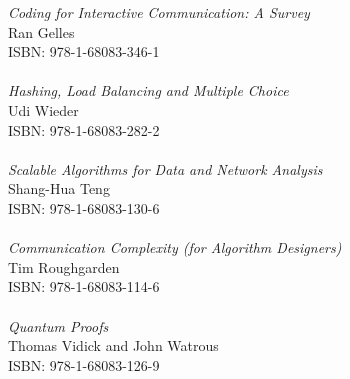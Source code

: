 \vspace{12pt}

\noindent \textit{Coding for Interactive Communication: A Survey}\\
Ran Gelles\\
ISBN: 978-1-68083-346-1\\
\\
\noindent \textit{Hashing, Load Balancing and Multiple Choice}\\
Udi Wieder\\
ISBN: 978-1-68083-282-2\\
\\
\noindent \textit{Scalable Algorithms for Data and Network Analysis}\\
Shang-Hua Teng\\
ISBN: 978-1-68083-130-6\\
\\
\noindent \textit{Communication Complexity (for Algorithm Designers)}\\
Tim Roughgarden \\
ISBN: 978-1-68083-114-6\\
\\
\noindent \textit{Quantum Proofs}\\
Thomas Vidick and John Watrous\\
ISBN: 978-1-68083-126-9